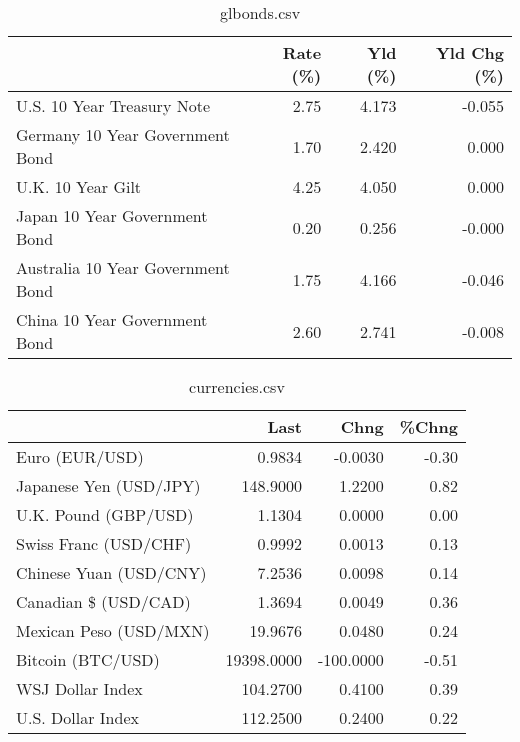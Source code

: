 \documentclass{article}%
\begin{document}
%


\begin{table}[htbp]%
\caption{glbonds.csv}%
\centering%
\begin{adjustbox}{width=1\textwidth}%
\begin{tabular}{lrrr}
\toprule
                                  &  Rate (\%) &  Yld (\%) &  Yld Chg (\%) \\
\midrule
       U.S. 10 Year Treasury Note &      2.75 &    4.173 &       -0.055 \\
  Germany 10 Year Government Bond &      1.70 &    2.420 &        0.000 \\
                U.K. 10 Year Gilt &      4.25 &    4.050 &        0.000 \\
    Japan 10 Year Government Bond &      0.20 &    0.256 &       -0.000 \\
Australia 10 Year Government Bond &      1.75 &    4.166 &       -0.046 \\
    China 10 Year Government Bond &      2.60 &    2.741 &       -0.008 \\
\bottomrule
\end{tabular}
%
\end{adjustbox}%
\end{table}

%


\begin{table}[htbp]%
\caption{currencies.csv}%
\centering%
\begin{adjustbox}{width=1\textwidth}%
\begin{tabular}{lrrr}
\toprule
                       &       Last &      Chng &  \%Chng \\
\midrule
        Euro (EUR/USD) &     0.9834 &   -0.0030 &  -0.30 \\
Japanese Yen (USD/JPY) &   148.9000 &    1.2200 &   0.82 \\
  U.K. Pound (GBP/USD) &     1.1304 &    0.0000 &   0.00 \\
 Swiss Franc (USD/CHF) &     0.9992 &    0.0013 &   0.13 \\
Chinese Yuan (USD/CNY) &     7.2536 &    0.0098 &   0.14 \\
  Canadian \$ (USD/CAD) &     1.3694 &    0.0049 &   0.36 \\
Mexican Peso (USD/MXN) &    19.9676 &    0.0480 &   0.24 \\
     Bitcoin (BTC/USD) & 19398.0000 & -100.0000 &  -0.51 \\
      WSJ Dollar Index &   104.2700 &    0.4100 &   0.39 \\
     U.S. Dollar Index &   112.2500 &    0.2400 &   0.22 \\
\bottomrule
\end{tabular}
%
\end{adjustbox}%
\end{table}

%
\end{document}

